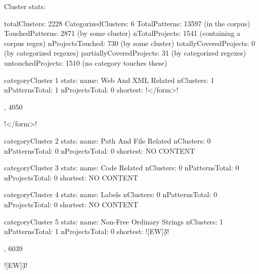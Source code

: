 Cluster stats:

totalClusters: 2228
CategorizedClusters: 6
TotalPatterns: 13597 (in the corpus)
TouchedPatterns: 2871 (by some cluster)
nTotalProjects: 1541 (containing a corpus regex)
nProjectsTouched: 730 (by some cluster)
totallyCoveredProjects: 0 (by categorized regexes)
partiallyCoveredProjects: 31 (by categorized regexes)
untouchedProjects: 1510 (no category touches these)

\begin{multicols}{2}
\begin{description}[noitemsep,topsep=0pt]
categoryCluster 1 stats:
name: Web And XML Related
nClusters: 1
nPatternsTotal: 1
nProjectsTotal: 0
shortest: \cverb!</form\s*>!

, 4050 \item [7 \<1\>] \cverb!</form\s*>!
\end{description}
\end{multicols}



\begin{multicols}{2}
\begin{description}[noitemsep,topsep=0pt]
categoryCluster 2 stats:
name: Path And File Related
nClusters: 0
nPatternsTotal: 0
nProjectsTotal: 0
shortest: NO CONTENT

\end{description}
\end{multicols}



\begin{multicols}{2}
\begin{description}[noitemsep,topsep=0pt]
categoryCluster 3 stats:
name: Code Related
nClusters: 0
nPatternsTotal: 0
nProjectsTotal: 0
shortest: NO CONTENT

\end{description}
\end{multicols}



\begin{multicols}{2}
\begin{description}[noitemsep,topsep=0pt]
categoryCluster 4 stats:
name: Labels
nClusters: 0
nPatternsTotal: 0
nProjectsTotal: 0
shortest: NO CONTENT

\end{description}
\end{multicols}



\begin{multicols}{2}
\begin{description}[noitemsep,topsep=0pt]
categoryCluster 5 stats:
name: Non-Free Ordinary Strings
nClusters: 1
nPatternsTotal: 1
nProjectsTotal: 0
shortest: \cverb![EW]\d{3}!

, 6039 \item [8 \<1\>] \cverb![EW]\d{3}!
\end{description}
\end{multicols}



